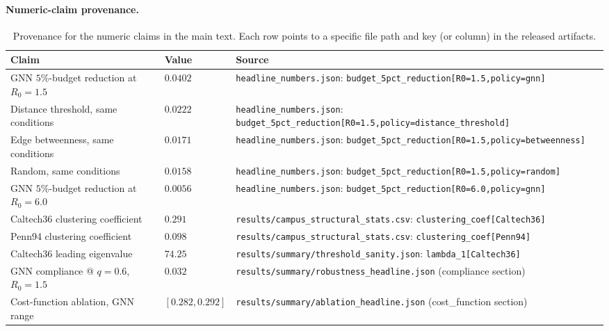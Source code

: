\documentclass{article}
\begin{document}
\paragraph{Numeric-claim provenance.}
\begin{table}[h]
\centering
\small
\begin{tabular}{lll}
\toprule
Claim & Value & Source \\
\midrule
GNN $5\%$-budget reduction at $R_0 = 1.5$       & $0.0402$ &
    \texttt{headline\_numbers.json}: \texttt{budget\_5pct\_reduction[R0=1.5,policy=gnn]} \\
Distance threshold, same conditions             & $0.0222$ &
    \texttt{headline\_numbers.json}: \texttt{budget\_5pct\_reduction[R0=1.5,policy=distance\_threshold]} \\
Edge betweenness, same conditions               & $0.0171$ &
    \texttt{headline\_numbers.json}: \texttt{budget\_5pct\_reduction[R0=1.5,policy=betweenness]} \\
Random, same conditions                         & $0.0158$ &
    \texttt{headline\_numbers.json}: \texttt{budget\_5pct\_reduction[R0=1.5,policy=random]} \\
GNN $5\%$-budget reduction at $R_0 = 6.0$       & $0.0056$ &
    \texttt{headline\_numbers.json}: \texttt{budget\_5pct\_reduction[R0=6.0,policy=gnn]} \\
Caltech36 clustering coefficient                & $0.291$ &
    \texttt{results/campus\_structural\_stats.csv}: \texttt{clustering\_coef[Caltech36]} \\
Penn94 clustering coefficient                   & $0.098$ &
    \texttt{results/campus\_structural\_stats.csv}: \texttt{clustering\_coef[Penn94]} \\
Caltech36 leading eigenvalue                    & $74.25$ &
    \texttt{results/summary/threshold\_sanity.json}: \texttt{lambda\_1[Caltech36]} \\
GNN compliance @ $q = 0.6$, $R_0 = 1.5$         & $0.032$ &
    \texttt{results/summary/robustness\_headline.json} (compliance section) \\
Cost-function ablation, GNN range               & $[0.282, 0.292]$ &
    \texttt{results/summary/ablation\_headline.json} (cost\_function section) \\
\bottomrule
\end{tabular}
\caption{Provenance for the numeric claims in the main text. Each
row points to a specific file path and key (or column) in the
released artifacts.}
\label{tab:provenance}
\end{table}
\end{document}
